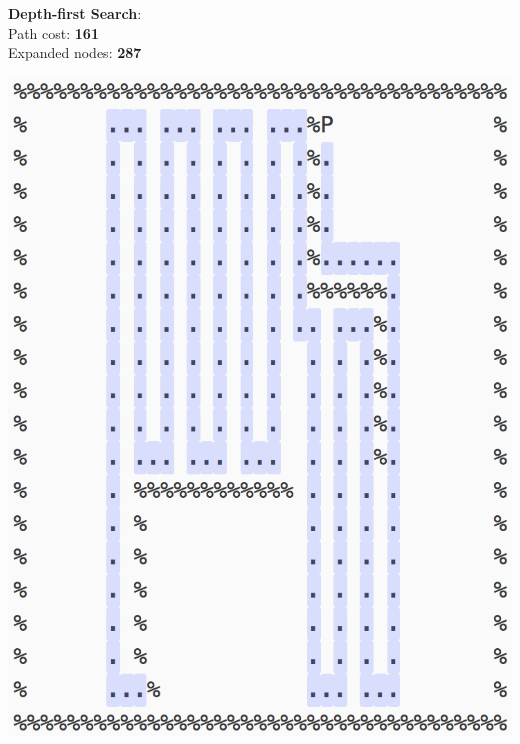 \documentclass[11pt]{article}
\begin{document}
\textbf{Depth-first Search}:\\
Path cost: \textbf{161}\\
Expanded nodes: \textbf{287}
\begin{center}
\includegraphics[scale=1]{open-maze/dfs.png}
\end{center}
\pagebreak
\end{document}
